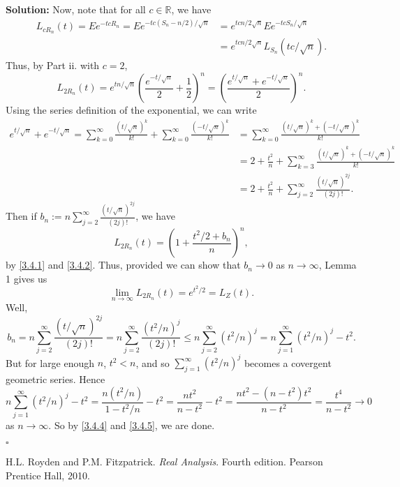 \documentclass[12pt]{article}
\newcounter{ProofCounter}
\newenvironment{Solution}{\stepcounter{ProofCounter}\textbf{Solution:}}{\hfill$\square$}
\begin{document}
\begin{Solution}
  Now, note that for all $c \in \mathbb{R}$, we have
  \begin{align*}
    L_{cR_n}(t) = Ee^{-tcR_n} = Ee^{-tc(S_n - n/2) / \sqrt{n}} & = e^{tcn / 2\sqrt{n}} Ee^{-tcS_n / \sqrt{n}} \\
    & = e^{tcn / 2\sqrt{n}} L_{S_n}(tc / \sqrt{n}).
  \end{align*}
  Thus, by Part ii. with $c = 2$,
  \begin{equation}
    L_{2R_n}(t) = e^{tn/\sqrt{n}} \left( \frac{e^{-t/\sqrt{n}}}{2} + \frac{1}{2} \right)^{n} = \left( \frac{e^{t/\sqrt{n}} + e^{-t/\sqrt{n}}}{2} \right)^{n}.
    \label{3.4.1}
  \end{equation}
  Using the series definition of the exponential, we can write
  \begin{align}
    e^{t/\sqrt{n}} + e^{-t/\sqrt{n}}  = \sum_{k=0}^{\infty} \frac{(t/\sqrt{n})^k}{k!} + \sum_{k=0}^{\infty} \frac{(-t/\sqrt{n})^k}{k!} & = \sum_{k=0}^{\infty} \frac{(t/\sqrt{n})^k + (-t/\sqrt{n})^k}{k!} \nonumber \\
    & = 2 + \frac{t^2}{n} + \sum_{k=3}^{\infty} \frac{(t/\sqrt{n})^k + (-t/\sqrt{n})^k}{k!} \nonumber \\
    & = 2 + \frac{t^2}{n} + \sum_{j=2}^{\infty} \frac{(t/\sqrt{n})^{2j}}{(2j)!}.
    \label{3.4.2}
  \end{align}
  Then if $b_n := n\sum_{j=2}^{\infty} \frac{(t/\sqrt{n})^{2j}}{(2j)!}$, we have
  \begin{equation}
    L_{2R_n}(t) = \left( 1 + \frac{t^2 / 2 + b_n}{n} \right)^{n},
    \label{3.4.3}
  \end{equation}
  by \eqref{3.4.1} and \eqref{3.4.2}. Thus, provided we can show that $b_n \rightarrow 0$ as $n \rightarrow \infty$, Lemma 1 gives us
  \[
    \lim_{n\rightarrow\infty} L_{2R_n}(t) = e^{t^2/2} = L_{Z}(t).
  \]
  Well,
  \begin{equation}
    b_n = n\sum_{j=2}^{\infty} \frac{(t/\sqrt{n})^{2j}}{(2j)!} = n\sum_{j=2}^{\infty} \frac{(t^2 / n)^j}{(2j)!} \leq n\sum_{j=2}^{\infty} (t^2 / n)^j = n\sum_{j=1}^{\infty}(t^2 / n)^j - t^2.
    \label{3.4.4}
  \end{equation}
  But for large enough $n$, $t^2 < n$, and so $\sum_{j=1}^{\infty}(t^2 / n)^j$ becomes a covergent geometric series. Hence
  \begin{equation}
    n\sum_{j=1}^{\infty}(t^2 / n)^j - t^2 = \frac{n(t^2/n)}{1 - t^2/n} - t^2 = \frac{nt^2}{n - t^2} - t^2 = \frac{nt^2 - (n-t^2)t^2}{n-t^2} = \frac{t^4}{n-t^2} \rightarrow 0
    \label{3.4.5}
  \end{equation}
  as $n \rightarrow \infty$. So by \eqref{3.4.4} and \eqref{3.4.5}, we are done.

\end{Solution}


\begin{thebibliography}{9}
    H.L. Royden and P.M. Fitzpatrick.
    \textit{Real Analysis}. Fourth edition.
    Pearson Prentice Hall, 2010.
\end{thebibliography}
\end{document}
